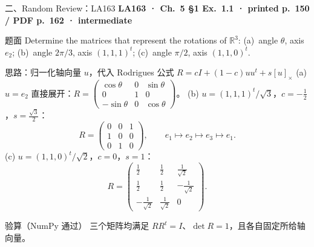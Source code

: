 \documentclass[aspectratio=169,10pt,fontset=none]{ctexbeamer}
\newcommand{\ex}[1]{\textcolor{accent}{\footnotesize\bfseries #1}}
\begin{document}
\begin{frame}[t]{二、Random Review：LA163}
  \leavevmode\ex{LA163 · Ch.~5 §1 Ex.~1.1 · printed p.~150 / PDF p.~162 · intermediate}
  \begin{block}{\footnotesize 题面}
    \scriptsize Determine the matrices that represent the rotations of $\mathbb R^3$: (a)~angle $\theta$, axis $e_2$; (b)~angle $2\pi/3$, axis $(1,1,1)^t$; (c)~angle $\pi/2$, axis $(1,1,0)^t$.
  \end{block}
  \begin{exampleblock}{\footnotesize 思路：归一化轴向量 $u$，代入 Rodrigues 公式 $R=cI+(1-c)uu^t+s[u]_\times$}
    \scriptsize
    (a) $u=e_2$ 直接展开：$R=\begin{pmatrix}\cos\theta&0&\sin\theta\\0&1&0\\-\sin\theta&0&\cos\theta\end{pmatrix}$。
    (b) $u=(1,1,1)^t/\sqrt3$，$c=-\tfrac12$，$s=\tfrac{\sqrt3}2$：
    $$R=\begin{pmatrix}0&0&1\\1&0&0\\0&1&0\end{pmatrix},\qquad e_1\mapsto e_2\mapsto e_3\mapsto e_1.$$
    (c) $u=(1,1,0)^t/\sqrt2$，$c=0$，$s=1$：
    $$R=\begin{pmatrix}\tfrac12&\tfrac12&\tfrac1{\sqrt2}\\\tfrac12&\tfrac12&-\tfrac1{\sqrt2}\\-\tfrac1{\sqrt2}&\tfrac1{\sqrt2}&0\end{pmatrix}.$$
  \end{exampleblock}
  \begin{block}{\footnotesize 验算（NumPy 通过）}
    \scriptsize 三个矩阵均满足 $RR^t=I$、$\det R=1$，且各自固定所给轴向量。
  \end{block}
\end{frame}
\end{document}
